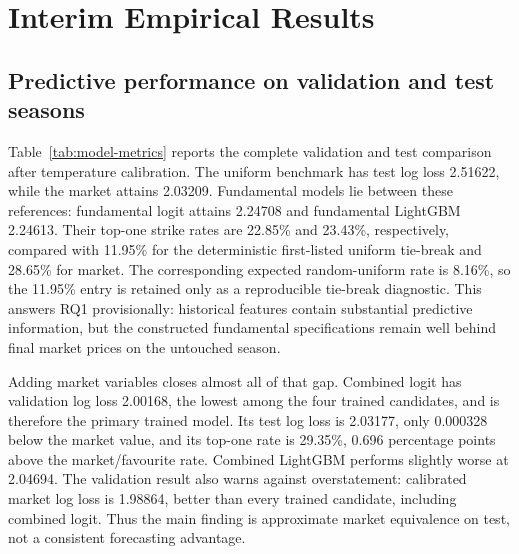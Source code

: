 \section{Interim Empirical Results}\label{sec:results}

\subsection{Predictive performance on validation and test seasons}\label{sec:results-prediction}
Table~\ref{tab:model-metrics} reports the complete validation and test comparison after temperature calibration. The uniform benchmark has test log loss 2.51622, while the market attains 2.03209. Fundamental models lie between these references: fundamental logit attains 2.24708 and fundamental LightGBM 2.24613. Their top-one strike rates are 22.85\% and 23.43\%, respectively, compared with 11.95\% for the deterministic first-listed uniform tie-break and 28.65\% for market. The corresponding expected random-uniform rate is 8.16\%, so the 11.95\% entry is retained only as a reproducible tie-break diagnostic. This answers RQ1 provisionally: historical features contain substantial predictive information, but the constructed fundamental specifications remain well behind final market prices on the untouched season.

Adding market variables closes almost all of that gap. Combined logit has validation log loss 2.00168, the lowest among the four trained candidates, and is therefore the primary trained model. Its test log loss is 2.03177, only 0.000328 below the market value, and its top-one rate is 29.35\%, 0.696 percentage points above the market/favourite rate. Combined LightGBM performs slightly worse at 2.04694. The validation result also warns against overstatement: calibrated market log loss is 1.98864, better than every trained candidate, including combined logit. Thus the main finding is approximate market equivalence on test, not a consistent forecasting advantage.

